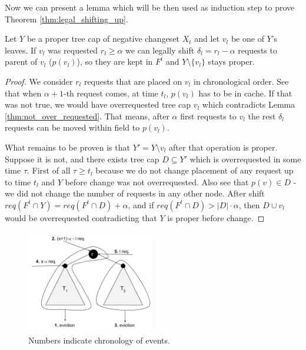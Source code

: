 Now we can present a lemma which will be then used as induction step to prove 
Theorem \ref{thm:legal_shifting_up}.
\begin{lemma}
 Let $Y$ be a proper tree cap of negative changeset $X_t$ and let $v_l$ be one 
of $Y$'s leaves. If $v_l$ was requested $r_l \geq \alpha$ we can legally shift  
$\delta_l = r_l - \alpha$ requests to parent of $v_l$ ($p(v_l)$), so they are 
kept in $F^t$ and $Y \setminus \{v_l\}$ stays proper. 
\end{lemma}
\begin{proof}
We consider $r_l$ requests that are placed on $v_l$ in chronological order. See 
that when $\alpha + 1$-th request comes, at time $t_l$, $p(v_l)$ has to be in 
cache. If that was not true, we would have overrequested tree cap 
${v_l}$ which 
contradicts Lemma \ref{thm:not_over_requested}. That means, after $\alpha$ first 
requests to $v_l$ the rest $\delta_l$ requests can be moved within field to 
$p(v_l)$.

What remains to be proven is that $Y' = Y \setminus {v_l}$ after that operation 
is proper. Suppose it is not, and there exists tree cap $D \subseteq Y'$ which 
is overrequested in some time $\tau$. First of all $\tau \geq t_l$ because we 
do not change placement of any request up to time $t_l$ and $Y$ before change 
was not overrequested. Also see that $p(v) \in D$ - we did not change the 
number of requests in any other node. After shift $req(F^t \cap Y) = req(F^t 
\cap D) + \alpha$, and if $req(F^t \cap D) > |D| \cdot \alpha$, then $D \cup 
v_l$ would be overrequested contradicting that $Y$ is proper before change.
\end{proof}
\begin{figure}
\vspace{-20pt}
 \begin{center}
  \includegraphics[width=0.5\textwidth]{example_not_even.png}
\end{center}
\caption{Numbers indicate chronology of events.}
\vspace{-20pt}
\label{fig:example_not_even}
\end{figure}
